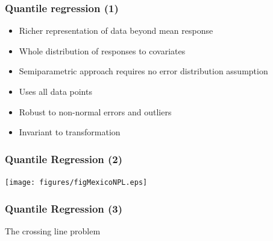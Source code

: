 \documentclass[aspectratio=43,dvipsnames,usenames, svgnames]{beamer}
\begin{document}
\begin{frame} %
\frametitle{Quantile regression (1)}
	\begin{itemize}
		\item Richer representation of data beyond mean response
		\smallskip
		\item Whole distribution of responses to covariates
		\smallskip
		\item Semiparametric approach requires no error distribution assumption
		\smallskip
		\item Uses all data points
		\smallskip
		\item Robust to non-normal errors and outliers
		\smallskip
		\item Invariant to transformation
	\end{itemize}
\end{frame}

\begin{frame} %
\frametitle{Quantile Regression (2)}
\begin{center}
	\texttt{[image: figures/figMexicoNPL.eps]}
\end{center}
\end{frame}

\begin{frame} %
\frametitle{Quantile Regression (3)}
\begin{center}
The crossing line problem \end{center}
\begin{center}
\end{center}
\end{frame}
\end{document}
